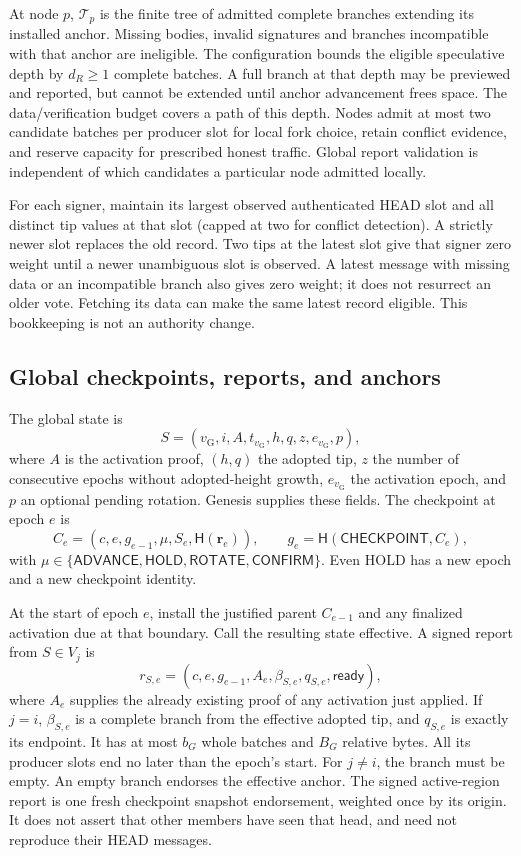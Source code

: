 \documentclass[11pt,a4paper,onecolumn]{article}
\newcommand{\Hash}{\mathsf H}
\newcommand{\gv}{v_{\mathrm G}}
\newcommand{\Tag}[1]{\mathsf{#1}}
\theoremstyle{remark}\newtheorem{example}[definition]{Example}
\begin{document}
At node $p$, $\mathcal T_p$ is the finite tree of admitted complete branches
extending its installed anchor. Missing bodies, invalid signatures and branches
incompatible with that anchor are ineligible. The configuration bounds the
eligible speculative depth by $d_R\geq1$ complete batches. A full branch at
that depth may be previewed and reported, but cannot be extended until anchor
advancement frees space. The data/verification budget covers a path of this
depth. Nodes admit at most two candidate batches per producer slot for local
fork choice, retain conflict evidence, and reserve capacity for prescribed
honest traffic. Global report validation is independent of which candidates
a particular node admitted locally.

For each signer, maintain its largest observed authenticated HEAD slot and
all distinct tip values at that slot (capped at two for conflict detection).
A strictly newer slot replaces the old record. Two tips at the latest slot
give that signer zero weight until a newer unambiguous slot is observed.
A latest message with missing data or an incompatible branch also gives zero
weight; it does not resurrect an older vote. Fetching its data can make the
same latest record eligible. This bookkeeping is not an authority change.

\subsection{Global checkpoints, reports, and anchors}\label{sec:gobjects}
The global state is
\[
 S=(\gv,i,A,t_{\gv},h,q,z,e_{\gv},p),
\]
where $A$ is the activation proof, $(h,q)$ the adopted tip, $z$ the number of
consecutive epochs without adopted-height growth, $e_{\gv}$ the activation
epoch, and $p$ an optional pending rotation. Genesis supplies these fields.
The checkpoint at epoch $e$ is
\begin{equation}\label{eq:global}
 C_e=(c,e,g_{e-1},\mu,S_e,\Hash(\mathbf r_e)),\qquad
 g_e=\Hash(\Tag{CHECKPOINT},C_e),
\end{equation}
with $\mu\in\{\Tag{ADVANCE},\Tag{HOLD},\Tag{ROTATE},\Tag{CONFIRM}\}$.
Even HOLD has a new epoch and a new checkpoint identity.

At the start of epoch $e$, install the justified parent $C_{e-1}$ and any
finalized activation due at that boundary. Call the resulting state effective.
A signed report from $S\in V_j$ is
\[
 r_{S,e}=(c,e,g_{e-1},A_e,\beta_{S,e},q_{S,e},\mathsf{ready}),
\]
where $A_e$ supplies the already existing proof of any activation just applied.
If $j=i$, $\beta_{S,e}$ is a complete branch from the effective adopted tip,
and $q_{S,e}$ is exactly its endpoint. It has at most $b_G$ whole batches and
$B_G$ relative bytes. All its producer slots end no later than the epoch's
start. For $j\ne i$, the branch must be empty. An empty branch endorses the
effective anchor. The signed active-region report is one fresh checkpoint
snapshot endorsement, weighted once by its origin. It does not assert that
other members have seen that head, and need not reproduce their HEAD messages.
\end{document}
